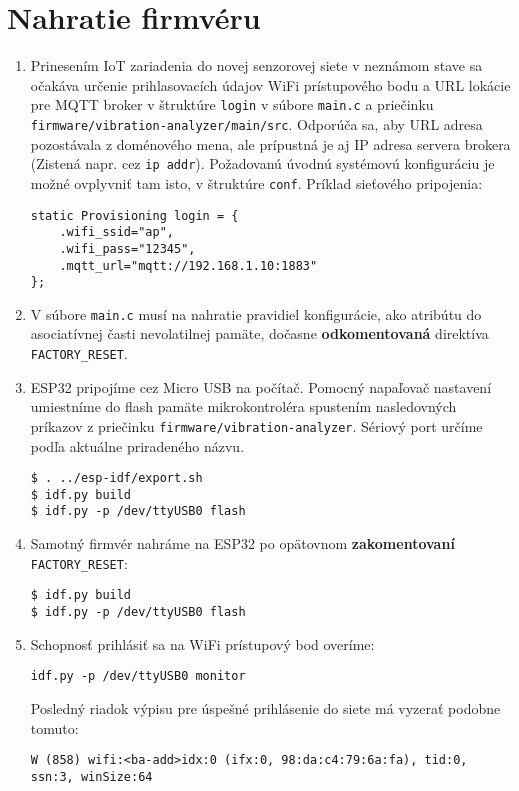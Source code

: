 \section{Nahratie firmvéru}
\begin{enumerate}
\item {Prinesením IoT zariadenia do novej senzorovej siete v neznámom stave sa očakáva určenie 
prihlasovacích údajov WiFi prístupového bodu a URL lokácie pre MQTT broker v štruktúre
\verb|login| v súbore \verb|main.c| a priečinku \verb|firmware/vibration-analyzer/main/src|.
Odporúča sa, aby URL adresa pozostávala z doménového mena, ale prípustná je aj IP adresa servera
brokera (Zistená napr. cez \verb|ip addr|). Požadovanú úvodnú systémovú konfiguráciu je možné
ovplyvniť tam isto, v štruktúre \verb|conf|. Príklad sieťového pripojenia:
\begin{lstlisting}[style=messages, morekeywords = {"ap","12345","mqtt://192.168.1.10:1883"}]
static Provisioning login = {
    .wifi_ssid="ap",
    .wifi_pass="12345",
    .mqtt_url="mqtt://192.168.1.10:1883"
};
\end{lstlisting}}

\item V súbore \verb|main.c| musí na nahratie pravidiel konfigurácie, ako atribútu do asociatívnej časti nevolatilnej pamäte, 
dočasne \textbf{odkomentovaná} direktíva \verb|FACTORY_RESET|.

\item ESP32 pripojíme cez Micro USB na počítač. Pomocný napaľovač nastavení umiestníme do flash pamäte mikrokontroléra spustením nasledovných príkazov z priečinku \verb|firmware/vibration-analyzer|. Sériový port určíme podľa aktuálne priradeného názvu.
\begin{lstlisting}[style=messages]
$ . ../esp-idf/export.sh
$ idf.py build
$ idf.py -p /dev/ttyUSB0 flash
\end{lstlisting}

\item Samotný firmvér nahráme na ESP32 po opätovnom \textbf{zakomentovaní} \\ \verb|FACTORY_RESET|:
\begin{lstlisting}[style=messages]
$ idf.py build
$ idf.py -p /dev/ttyUSB0 flash
\end{lstlisting}

\item Schopnosť prihlásiť sa na WiFi prístupový bod overíme:
\begin{lstlisting}[style=messages]
idf.py -p /dev/ttyUSB0 monitor
\end{lstlisting}
Posledný riadok výpisu pre úspešné prihlásenie do siete má vyzerať podobne tomuto:
\begin{lstlisting}[style=messages]
W (858) wifi:<ba-add>idx:0 (ifx:0, 98:da:c4:79:6a:fa), tid:0, ssn:3, winSize:64
\end{lstlisting}


\end{enumerate}
